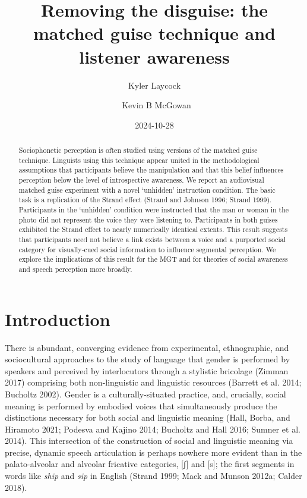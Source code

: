 \documentclass[
  letterpaper,
  DIV=11,
  numbers=noendperiod]{scrartcl}
\title{Removing the disguise: the matched guise technique and listener
awareness}
\author{Kyler Laycock \and ~Kevin B McGowan}
\date{2024-10-28}
\begin{document}
\maketitle
\begin{abstract}
Sociophonetic perception is often studied using versions of the matched
guise technique. Linguists using this technique appear united in the
methodological assumptions that participants believe the manipulation
and that this belief influences perception below the level of
introspective awareness. We report an audiovisual matched guise
experiment with a novel `unhidden' instruction condition. The basic task
is a replication of the Strand effect (Strand and Johnson 1996; Strand
1999). Participants in the `unhidden' condition were instructed that the
man or woman in the photo did not represent the voice they were
listening to. Participants in both guises exhibited the Strand effect to
nearly numerically identical extents. This result suggests that
participants need not believe a link exists between a voice and a
purported social category for visually-cued social information to
influence segmental perception. We explore the implications of this
result for the MGT and for theories of social awareness and speech
perception more broadly.
\end{abstract}


\section{Introduction}\label{sec-intro}

There is abundant, converging evidence from experimental, ethnographic,
and sociocultural approaches to the study of language that gender is
performed by speakers and perceived by interlocutors through a stylistic
bricolage (Zimman 2017) comprising both non-linguistic and linguistic
resources (Barrett et al. 2014; Bucholtz 2002). Gender is a
culturally-situated practice, and, crucially, social meaning is
performed by embodied voices that simultaneously produce the
distinctions necessary for both social and linguistic meaning (Hall,
Borba, and Hiramoto 2021; Podesva and Kajino 2014; Bucholtz and Hall
2016; Sumner et al. 2014). This intersection of the construction of
social and linguistic meaning via precise, dynamic speech articulation
is perhaps nowhere more evident than in the palato-alveolar and alveolar
fricative categories, {[}ʃ{]} and {[}s{]}; the first segments in words
like \emph{ship} and \emph{sip} in English (Strand 1999; Mack and Munson
2012a; Calder 2018).
\end{document}
